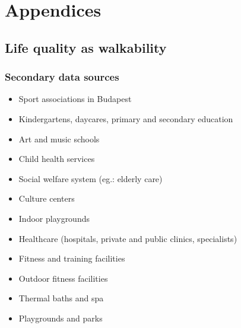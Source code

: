 \chapter{Appendices}

\section{Life quality as walkability}

\subsection{Secondary data sources}
\label{SI:walkabilityData}
\begin{itemize}
  \item {Sport associations in Budapest}~\cite{HU_sport}
  \item {Kindergartens, daycares, primary and secondary education}~\cite{HU_Edu}
  \item {Art and music schools}~\cite{HU_Art}
  \item {Child health services}~\cite{HU_Child}
  \item {Social welfare system (eg.: elderly care)}~\cite{HU_Social}
  \item {Culture centers}~\cite{HU_Cult}
  \item {Indoor playgrounds}~\cite{HU_Play}
  \item {Healthcare (hospitals, private and public clinics, specialists)}~\cite{HU_Health}
  \item {Fitness and training facilities}~\cite{HU_Fitness}
  \item {Outdoor fitness facilities}~\cite{HU_outfitness}
  \item {Thermal baths and spa}~\cite{HU_Thermal}
  \item {Playgrounds and parks}~\cite{HU_Park}
\end{itemize}



